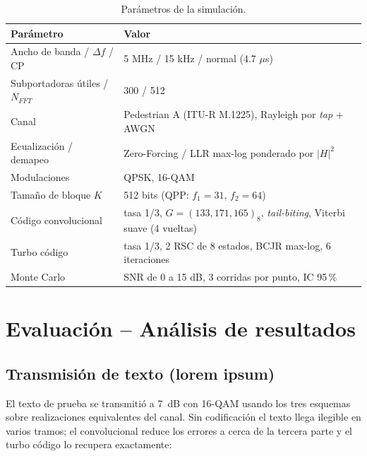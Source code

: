 \documentclass[conference,onecolumn]{IEEEtran}
\begin{document}
\begin{table}[H]
\centering
\caption{Parámetros de la simulación.}
\label{tab:params}
\begin{tabular}{|l|l|}
\hline
\textbf{Parámetro} & \textbf{Valor} \\
\hline
Ancho de banda / $\Delta f$ / CP & 5 MHz / 15 kHz / normal (4.7 $\mu$s) \\
Subportadoras útiles / $N_{FFT}$ & 300 / 512 \\
Canal & Pedestrian A (ITU-R M.1225), Rayleigh por \textit{tap} + AWGN \\
Ecualización / demapeo & Zero-Forcing / LLR max-log ponderado por $|H|^2$ \\
Modulaciones & QPSK, 16-QAM \\
Tamaño de bloque $K$ & 512 bits (QPP: $f_1=31$, $f_2=64$) \\
Código convolucional & tasa 1/3, $G=(133,171,165)_8$, \textit{tail-biting}, Viterbi suave (4 vueltas) \\
Turbo código & tasa 1/3, 2 RSC de 8 estados, BCJR max-log, 6 iteraciones \\
Monte Carlo & SNR de 0 a 15 dB, 3 corridas por punto, IC 95\,\% \\
\hline
\end{tabular}
\end{table}


\section{Evaluación -- Análisis de resultados}

\subsection{Transmisión de texto (lorem ipsum)}

El texto de prueba se transmitió a 7~dB con 16-QAM usando los tres esquemas sobre
realizaciones equivalentes del canal. Sin codificación el texto llega ilegible en varios tramos;
el convolucional reduce los errores a cerca de la tercera parte y el turbo código lo recupera
exactamente:
\end{document}
